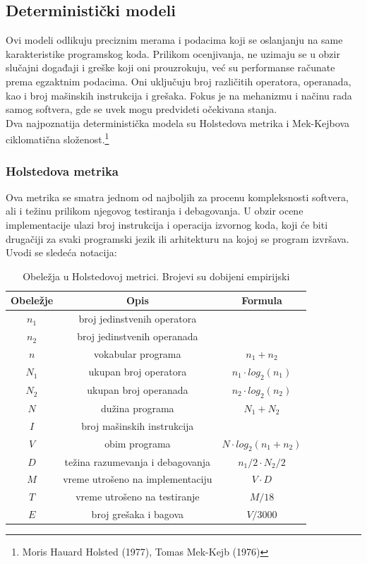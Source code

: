 \documentclass[a4paper]{article}
\begin{document}
\subsection{Deterministički modeli}
\label{sec:deterministicki}

Ovi modeli odlikuju preciznim merama i podacima koji se oslanjanju na same karakteristike programskog koda. Prilikom ocenjivanja, ne uzimaju se u obzir slučajni događaji i greške koji oni prouzrokuju, već su performanse računate prema egzaktnim podacima. Oni uključuju broj različitih operatora, operanada, kao i broj mašinskih instrukcija i grešaka. Fokus je na mehanizmu i načinu rada samog softvera, gde se uvek mogu predvideti očekivana stanja.\\
Dva najpoznatija deterministička modela su Holstedova metrika i Mek-Kejbova ciklomatična složenost.\footnote{Moris Hauard Holsted (1977), Tomas Mek-Kejb (1976)}

\subsubsection{Holstedova metrika}
\label{subsec:holsted}

Ova metrika se smatra jednom od najboljih za procenu kompleksnosti softvera, ali i težinu prilikom njegovog testiranja i debagovanja. U obzir ocene implementacije ulazi broj instrukcija i operacija izvornog koda, koji će biti drugačiji za svaki programski jezik ili arhitekturu na kojoj se program izvršava. Uvodi se sledeća notacija:\\

\begin{table}[h]
\centering
 \begin{tabular}{|c|c|c|}
  \hline
  Obeležje & Opis & Formula \\ [0ex] 
  \hline
  $n_1$ & broj jedinstvenih operatora & \\ 
  \hline
  $n_2$ & broj jedinstvenih operanada & \\ 
  \hline
  $n$ & vokabular programa & $ n_1 + n_2 $ \\ 
  \hline
  $N_1$ & ukupan broj operatora & $ n_1 \cdot log_2(n_1) $ \\ 
  \hline
  $N_2$ & ukupan broj operanada & $ n_2 \cdot log_2(n_2) $ \\ 
  \hline
  $N$ & dužina programa & $ N_1 + N_2 $ \\
  \hline
  $I$ & broj mašinskih instrukcija & \\
  \hline
  $V$ & obim programa & $ N \cdot log_2(n_1+n_2) $ \\
  \hline
  $D$ & težina razumevanja i debagovanja & $ n_1/2 \cdot N_2 / 2  $ \\
  \hline
  $M$ & vreme utrošeno na implementaciju & $ V \cdot D $ \\
  \hline
  $T$ & vreme utrošeno na testiranje & $ M / 18 $ \\
  \hline
  $E$ & broj grešaka i bagova & $ V / 3000 $ \\
  \hline
 \end{tabular}
 \caption{Obeležja u Holstedovoj metrici. Brojevi su dobijeni empirijski \cite{ibm_halstead}}
 \label{tabela:1} 
\end{table}
\end{document}
